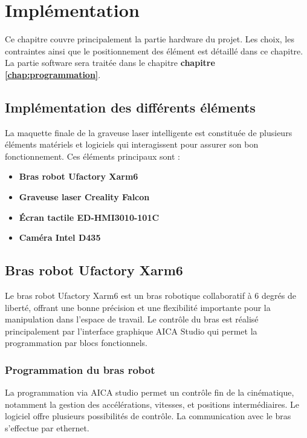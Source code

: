 \chapter{Implémentation}
\label{chap:implémentation}

Ce chapitre couvre principalement la partie \gls{hardware} du projet. Les choix, les contraintes ainsi que le positionnement des élément est détaillé dans ce chapitre. La partie \gls{software} sera traitée dans le chapitre \textbf{chapitre \ref{chap:programmation}}.

\section{Implémentation des différents éléments}

La maquette finale de la graveuse laser intelligente est constituée de plusieurs éléments matériels et logiciels qui interagissent pour assurer son bon fonctionnement. Ces éléments principaux sont :

\begin{itemize}
    \item \textbf{Bras robot Ufactory Xarm6}
    \item \textbf{Graveuse laser Creality Falcon}
    \item \textbf{Écran tactile ED-HMI3010-101C}
    \item \textbf{Caméra Intel D435}
\end{itemize}

\section{Bras robot Ufactory Xarm6}

Le bras robot Ufactory Xarm6 est un bras robotique collaboratif à 6 degrés de liberté, offrant une bonne précision et une flexibilité importante pour la manipulation dans l'espace de travail. Le contrôle du bras est réalisé principalement par l’interface graphique AICA Studio qui permet la programmation par blocs fonctionnels.

\subsection{Programmation du bras robot}
La programmation via AICA studio permet un contrôle fin de la cinématique, notamment la gestion des accélérations, vitesses, et positions intermédiaires. Le logiciel offre plusieurs possibilités de contrôle. La communication avec le bras s’effectue par ethernet.

